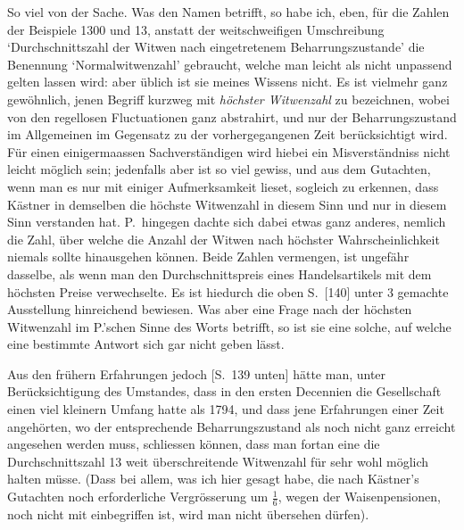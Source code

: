 \documentclass[12pt,a4paper]{article}
\begin{document}
So viel von der Sache. Was den Namen betrifft, so habe ich, eben, f\"ur die Zahlen der Beispiele 1300 und 13, anstatt der weitschweifigen Umschreibung `Durchschnittszahl der Witwen nach eingetretenem Beharrungszustande' die Benennung `Normalwitwenzahl' gebraucht, welche man leicht als nicht unpassend gelten lassen wird: aber \"ublich ist sie meines Wissens nicht. Es ist vielmehr ganz gew\"ohnlich, jenen Begriff kurzweg mit \textit{h\"ochster Witwenzahl} zu bezeichnen, wobei von den regellosen Fluctuationen ganz abstrahirt, und nur der Beharrungszustand im Allgemeinen im Gegensatz zu der vorhergegangenen Zeit ber\"ucksichtigt wird. F\"ur einen einigermaassen Sachverst\"andigen wird hiebei ein Misverst\"andniss nicht leicht m\"oglich sein; jedenfalls aber ist so viel gewiss, und aus dem Gutachten, wenn man es nur mit einiger Aufmerksamkeit lieset, sogleich zu erkennen, dass K\"astner in demselben die h\"ochste Witwenzahl in diesem Sinn und nur in diesem Sinn verstanden hat. P.\ hingegen dachte sich dabei etwas ganz anderes, nemlich die Zahl, \"uber welche die Anzahl der Witwen nach h\"ochster Wahrscheinlichkeit niemals sollte hinausgehen k\"onnen. Beide Zahlen vermengen, ist ungef\"ahr dasselbe, als wenn man den Durchschnittspreis eines Handelsartikels mit dem h\"ochsten Preise verwechselte. Es ist hiedurch die oben S.\ [140] unter 3 gemachte Ausstellung hinreichend bewiesen. Was aber eine Frage nach der h\"ochsten Witwenzahl im P.'schen Sinne des Worts betrifft, so ist sie eine solche, auf welche eine bestimmte Antwort sich gar nicht geben l\"asst.

Aus den fr\"uhern Erfahrungen jedoch [S.\ 139 unten] h\"atte man, unter Ber\"ucksichtigung des Umstandes, dass in den ersten Decennien die Gesellschaft einen viel kleinern Umfang hatte als 1794, und dass jene Erfahrungen einer Zeit angeh\"orten, wo der entsprechende Beharrungszustand als noch nicht ganz erreicht angesehen werden muss, schliessen k\"onnen, dass man fortan eine die Durchschnittszahl 13 weit \"uberschreitende Witwenzahl f\"ur sehr wohl m\"oglich halten m\"usse. (Dass bei allem, was ich hier gesagt habe, die nach K\"astner's Gutachten noch erforderliche Vergr\"osserung um $\frac{1}{6}$, wegen der Waisenpensionen, noch nicht mit einbegriffen ist, wird man nicht \"ubersehen d\"urfen).
\end{document}
